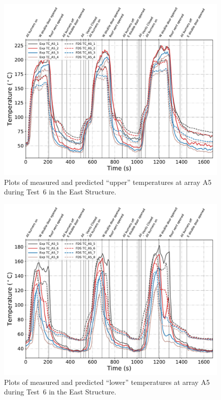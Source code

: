 \clearpage
\begin{figure}[p]
	\centering
	\includegraphics[width=\columnwidth]{Figures/Plots/Validation/Temperature/Test_6_TC_A5_upper}
	\caption{Plots of measured and predicted ``upper'' temperatures at array A5 during Test~6 in the East Structure.}
	\label{fig:TCA5_upper_data_Test6}
\end{figure}
\begin{figure}[p]
	\centering
	\includegraphics[width=\columnwidth]{Figures/Plots/Validation/Temperature/Test_6_TC_A5_lower}
	\caption{Plots of measured and predicted ``lower'' temperatures at array A5 during Test~6 in the East Structure.}
	\label{fig:TCA5_lower_data_Test6}
\end{figure}

